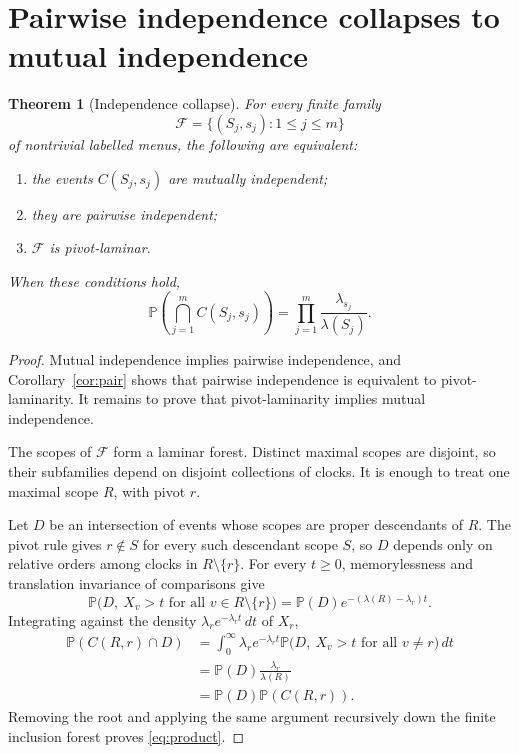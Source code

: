 \documentclass[11pt]{article}
\newtheorem{theorem}{Theorem}[section]
\theoremstyle{definition}
\newcommand{\Pp}{\mathbb{P}}
\newcommand{\1}{\mathbf{1}}
\begin{document}
\section{Pairwise independence collapses to mutual independence}

\begin{theorem}[Independence collapse]
\label{thm:collapse}
For every finite family
\[
\mathcal F=\{(S_j,s_j):1\leq j\leq m\}
\]
of nontrivial labelled menus, the following are equivalent:

\begin{enumerate}
\item the events \(C(S_j,s_j)\) are mutually independent;
\item they are pairwise independent;
\item \(\mathcal F\) is pivot-laminar.
\end{enumerate}

When these conditions hold,
\begin{equation}
\label{eq:product}
\Pp\left(\bigcap_{j=1}^m C(S_j,s_j)\right)
=\prod_{j=1}^m\frac{\lambda_{s_j}}{\lambda(S_j)}.
\end{equation}
\end{theorem}

\begin{proof}
Mutual independence implies pairwise independence, and Corollary~\ref{cor:pair} shows that pairwise
independence is equivalent to pivot-laminarity. It remains to prove that pivot-laminarity implies
mutual independence.

The scopes of \(\mathcal F\) form a laminar forest. Distinct maximal scopes are disjoint, so their
subfamilies depend on disjoint collections of clocks. It is enough to treat one maximal scope
\(R\), with pivot \(r\).

Let \(D\) be an intersection of events whose scopes are proper descendants of \(R\). The pivot rule
gives \(r\notin S\) for every such descendant scope \(S\), so \(D\) depends only on relative orders
among clocks in \(R\setminus\{r\}\). For every \(t\geq0\), memorylessness and translation invariance
of comparisons give
\[
\Pp\bigl(D,\ X_v>t\text{ for all }v\in R\setminus\{r\}\bigr)
=\Pp(D)e^{-(\lambda(R)-\lambda_r)t}.
\]
Integrating against the density \(\lambda_r e^{-\lambda_rt}\,dt\) of \(X_r\),
\begin{align*}
\Pp(C(R,r)\cap D)
&=\int_0^\infty
\lambda_r e^{-\lambda_rt}
\Pp\bigl(D,\ X_v>t\text{ for all }v\ne r\bigr)\,dt\\
&=\Pp(D)\frac{\lambda_r}{\lambda(R)}\\
&=\Pp(D)\Pp(C(R,r)).
\end{align*}
Removing the root and applying the same argument recursively down the finite inclusion forest proves
\eqref{eq:product}.
\end{proof}
\end{document}
